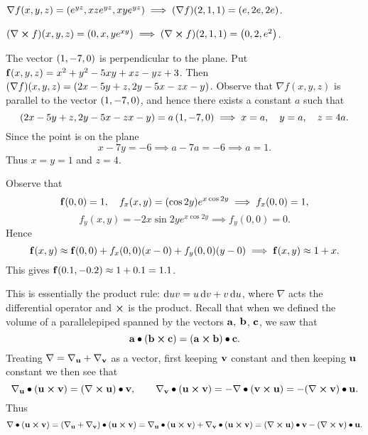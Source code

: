 \begin{Answer}{3.16}
$\nabla f(x,y,z)=\left( e^{yz} ,xze^{yz},xye^{yz} \right)\implies
(\nabla f)(2,1,1) =  \left( e,2e,2e \right) $.
\end{Answer}
\begin{Answer}{3.17}
$(\nabla \boldsymbol\times f)(x,y,z)=\left( 0,x, ye^{xy} \right) \implies (\nabla
\boldsymbol\times f)(2,1,1)=\left( 0,2 ,e^2 \right)$.
\end{Answer}
\begin{Answer}{3.19}
 The vector $\left( 1 ,-7 ,0 \right)$ is perpendicular to the plane. Put $\mathbf{ f}(x,y,z)=x^2+y^2-5xy+xz-yz+3$. Then $(\nabla f)(x,y,z)=\left( 2x-5y+z ,2y-5x-z \\
x-y \right)$. Observe that $\nabla f(x,y,z)$ is parallel to the vector
$\left( 1 ,-7 ,0 \right)$, and hence there exists a constant $a$ such
that $$ \left( 2x-5y+z ,2y-5x-z \\
x-y \right)=a\left( 1 ,-7 ,0 \right) \implies x=a, \quad y=a, \quad z=4a.$$
Since the point is on the plane $$x-7y=-6 \implies a-7a=-6 \implies
a=1.$$ Thus $x=y=1$ and $z=4$.
\end{Answer}
\begin{Answer}{3.22}
Observe that $$\mathbf{ f}(0,0) =1, \quad f_x(x,y) = (\cos 2y)e^{x\cos 2y}
\implies f_x(0,0)=1, $$ $$ f_y(x,y) = -2x\sin 2ye^{x\cos 2y}
\implies f_y(0,0) = 0.
$$Hence
$$\mathbf{ f}(x,y) \approx \mathbf{ f}(0,0) + f_x(0,0)(x-0) + f_y(0,0)(y-0) \implies \mathbf{ f}(x,y)\approx 1 + x. $$
This gives $\mathbf{ f}(0.1,-0.2)\approx 1+0.1 = 1.1$.
\end{Answer}
\begin{Answer}{3.23}
This is essentially the product rule: $\d{uv} = u\d{v}+v\d{u}$,
where $\nabla$ acts the differential operator and $\boldsymbol\times$ is the
product. Recall that when we defined the volume of a parallelepiped
spanned by the vectors $\mathbf{ a},$ $\mathbf{ b}$, $\mathbf{ c}$, we
saw that
$$ \mathbf{ a}\bullet (\mathbf{ b}\boldsymbol\times\mathbf{ c}) = (\mathbf{ a}\boldsymbol\times\mathbf{ b})\bullet \mathbf{ c}.  $$
Treating $\nabla = \nabla _{\mathbf{ u}}+ \nabla _{\mathbf{ v}}$ as a
vector, first keeping $\mathbf{ v}$ constant and then keeping
$\mathbf{ u}$ constant  we then see that
$$ \nabla _{\mathbf{ u}} \bullet (\mathbf{ u}\boldsymbol\times\mathbf{ v})= (\mathbf{ \nabla}\boldsymbol\times\mathbf{ u})\bullet \mathbf{ v}, \qquad   \nabla  _{\mathbf{ v}} \bullet (\mathbf{ u}\boldsymbol\times\mathbf{ v})=  -\nabla \bullet (\mathbf{ v}\boldsymbol\times\mathbf{ u})  = -(\mathbf{ \nabla}\boldsymbol\times\mathbf{ v})\bullet \mathbf{ u}. $$
Thus
$$\nabla \bullet ({\mathbf u}\boldsymbol\times {\mathbf v}) = (\nabla _{\mathbf{ u}} + \nabla _{\mathbf{ v}}) \bullet ({\mathbf u}\boldsymbol\times {\mathbf v})
= \nabla _{\mathbf{ u}} \bullet (\mathbf{ u}\boldsymbol\times\mathbf{ v}) + \nabla
_{\mathbf{ v}} \bullet (\mathbf{ u}\boldsymbol\times\mathbf{ v}) =
(\mathbf{ \nabla}\boldsymbol\times\mathbf{ u})\bullet \mathbf{ v}-
(\mathbf{ \nabla}\boldsymbol\times\mathbf{ v})\bullet \mathbf{ u}.
   $$
\end{Answer}
